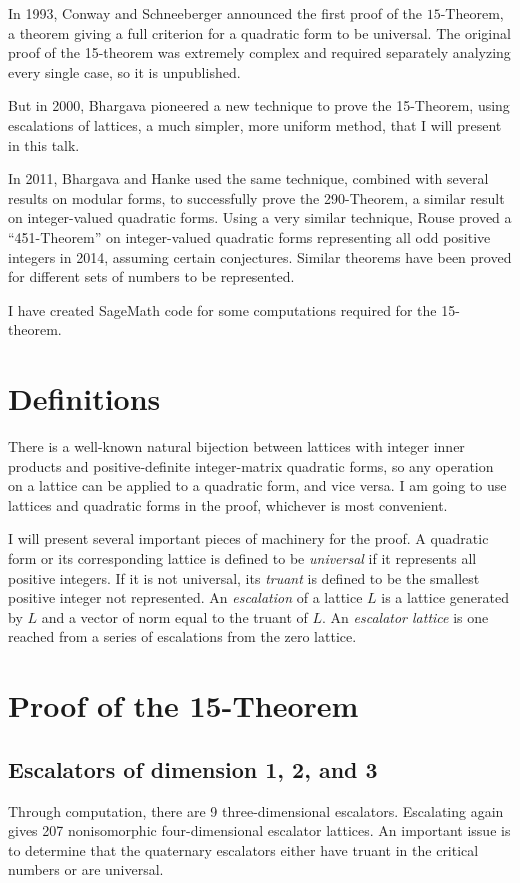 \documentclass[letterpaper, 12pt]{article}
\begin{document}
In 1993, Conway and Schneeberger announced the first proof of the $15$-Theorem, a theorem giving a full criterion for a quadratic form to be universal.
The original proof of the 15-theorem was extremely complex and required separately analyzing every single case, so it is unpublished.

But in 2000, Bhargava pioneered a new technique to prove the 15-Theorem, using escalations of lattices, a much simpler, more uniform method, that I will present in this talk.

In 2011, Bhargava and Hanke used the same technique, combined with several results on modular forms, to successfully prove the 290-Theorem, a similar result on integer-valued quadratic forms.
Using a very similar technique, Rouse proved a ``451-Theorem'' on integer-valued quadratic forms representing all odd positive integers in 2014, assuming certain conjectures. Similar theorems have been proved for different sets of numbers to be represented.

I have created SageMath code for some computations required for the 15-theorem.

\section{Definitions}
There is a well-known natural bijection between lattices with integer inner products and positive-definite integer-matrix quadratic forms, so any operation on a lattice can be applied to a quadratic form, and vice versa. I am going to use lattices and quadratic forms in the proof, whichever is most convenient.

I will present several important pieces of machinery for the proof. A quadratic form or its corresponding lattice is defined to be \emph{universal} if it represents all positive integers. If it is not universal, its \emph{truant} is defined to be the smallest positive integer not represented. An \emph{escalation} of a lattice $L$ is a lattice generated by $L$ and a vector of norm equal to the truant of $L$. An \emph{escalator lattice} is one reached from a series of escalations from the zero lattice.

\section{Proof of the 15-Theorem}
\subsection{Escalators of dimension 1, 2, and 3}
Through computation, there are 9 three-dimensional escalators.
Escalating again gives 207 nonisomorphic four-dimensional escalator lattices. An important issue is to determine that the quaternary escalators either have truant in the critical numbers or are universal.
\end{document}

